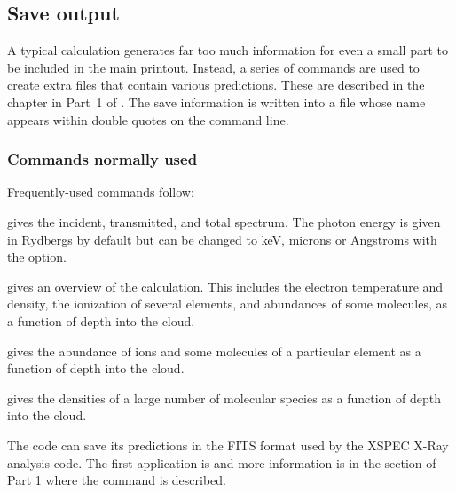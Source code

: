 \documentclass[12pt,twoside]{article}
\begin{document}







\subsection{Save output}
\label{sec:SaveOutput}

A typical calculation generates far too much information for even a small
part to be included in the main printout.  Instead, a series of
commands are used to create extra files that contain various predictions.
These are described in the chapter 
in Part~1 of \Hazy.
The save information is written into a file whose name appears
within double quotes on the command line.

\subsubsection{Commands normally used}

Frequently-used commands follow:

 gives the incident,
transmitted, and total spectrum.
The photon energy is given in Rydbergs by default but can be changed to
keV, microns or Angstroms with the  option.

 gives an overview
of the calculation.  This includes the
electron temperature and density, the ionization of several elements, and
abundances of some molecules, as a function of depth into the cloud.

 gives the abundance
of ions and some molecules of a
particular element as a function of depth into the cloud.

 gives the densities
of a large number of molecular species
as a function of depth into the cloud.

\quad The code can save
its predictions in the FITS format used
by the XSPEC X-Ray analysis code.  The first application is \citet{PorterEtAl06}
and more information is in the section
of Part 1 where the  command is described.
\end{document}
